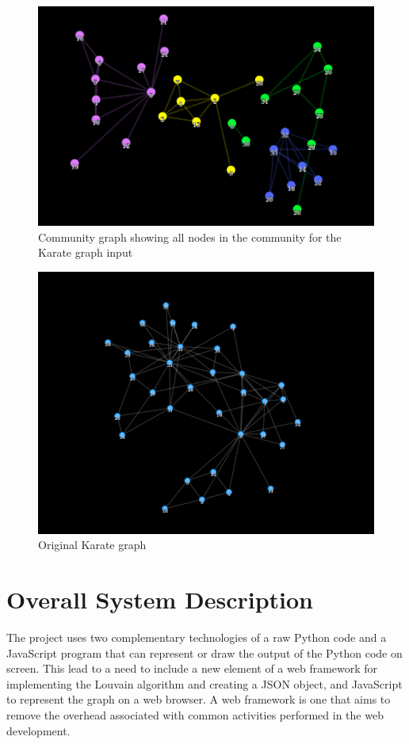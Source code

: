 \begin{figure}[H]
\centering
\includegraphics[scale=0.3]{o2.png}
\caption{\label{o2}Community graph showing all nodes in the community for the Karate graph input}
\end{figure}

\begin{figure}[H]
\centering
\includegraphics[scale=0.3]{o3.png}
\caption{\label{o3}Original Karate graph}
\end{figure}

\chapter{Overall System Description}
The project uses two complementary technologies of a raw Python code and a JavaScript program that can represent or draw the output of the Python code on screen. This lead to a need to include a new element of a web framework for implementing the Louvain algorithm and creating a JSON object, and JavaScript to represent the graph on a web browser.   A web framework is one that aims to remove the overhead associated with common activities performed in the web development. 
